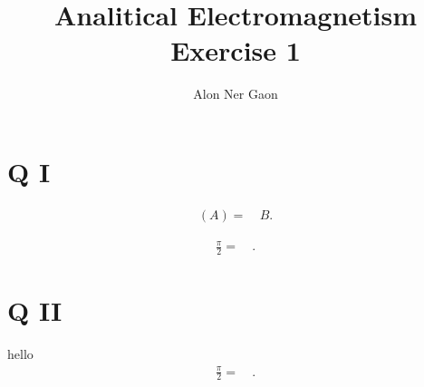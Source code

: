 \documentclass[notitlepage]{report}
\title{\Huge{Analitical Electromagnetism}\\Exercise 1}
\author{Alon Ner Gaon}
\begin{document}
\maketitle

\section{Q I}
\begin{exercise}{}{}
	\begin{align*}
		\left(A\right) =&\  B 
	.\end{align*}
\end{exercise}
\begin{question}{3}{3}
	\begin{align*}
		\frac{\pi}{2} =&\  
	.\end{align*}
\end{question}

\section{Q II}
\begin{qstion}{hello}{}
	\begin{align*}
		\frac{\pi}{2} =&\  
	.\end{align*}
\end{qstion}
\end{document}
